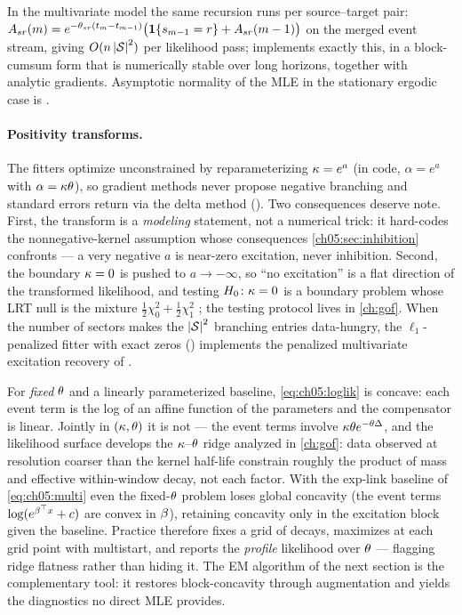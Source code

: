 In the multivariate model the same recursion runs per source--target pair:
$A_{sr}(m) = e^{-\theta_{sr}(t_m - t_{m-1})}\big(\mathbf{1}\{s_{m-1}=r\} +
A_{sr}(m-1)\big)$ on the merged event stream, giving $O(n\left|\mathcal{S}\right|^2)$
per likelihood pass;  implements exactly
this, in a block-cumsum form that is numerically stable over long
horizons, together with analytic gradients. Asymptotic normality of the
MLE in the stationary ergodic case is \citet{ogata1978}.

\paragraph{Positivity transforms.} The fitters optimize unconstrained by
reparameterizing $\kappa = e^{a}$ (in code, $\alpha = e^{a}$ with
$\alpha=\kappa\theta$), so gradient methods never propose negative
branching and standard errors return via the delta method
(). Two consequences deserve note. First,
the transform is a \emph{modeling} statement, not a numerical trick: it
hard-codes the nonnegative-kernel assumption whose consequences
\cref{ch05:sec:inhibition} confronts --- a very negative $a$ is
near-zero excitation, never inhibition. Second, the boundary $\kappa = 0$
is pushed to $a \to -\infty$, so ``no excitation'' is a flat direction of
the transformed likelihood, and testing $H_0\colon \kappa = 0$ is a
boundary problem whose LRT null is the mixture
$\tfrac12\chi^2_0 + \tfrac12\chi^2_1$ \citep{selfliang1987}; the testing
protocol lives in \cref{ch:gof}. When the number of sectors makes the
$\left|\mathcal{S}\right|^2$ branching entries data-hungry, the $\ell_1$-penalized
fitter with exact zeros () implements the
penalized multivariate excitation recovery of \citet{hansen2015}.

\begin{warning}\label{warn:ch05:nonconcave}
For \emph{fixed} $\theta$ and a linearly parameterized baseline,
\cref{eq:ch05:loglik} is concave: each event term is the log of an affine
function of the parameters and the compensator is linear. Jointly in
$(\kappa,\theta)$ it is not --- the event terms involve
$\kappa\theta e^{-\theta \Delta}$, and the likelihood surface develops
the $\kappa$--$\theta$ ridge analyzed in \cref{ch:gof}: data observed at
resolution coarser than the kernel half-life constrain roughly the product
of mass and effective within-window decay, not each factor. With the
exp-link baseline of \cref{eq:ch05:multi} even the fixed-$\theta$
problem loses global concavity (the event terms
$\log(e^{\beta^\top x}+c)$ are convex in $\beta$), retaining
concavity only in the excitation block given the baseline. Practice
therefore fixes a grid of decays, maximizes at each grid point with
multistart, and reports the \emph{profile} likelihood over $\theta$ ---
flagging ridge flatness rather than hiding it. The EM algorithm of the
next section is the complementary tool: it restores block-concavity
through augmentation and yields the diagnostics no direct MLE provides.
\end{warning}

